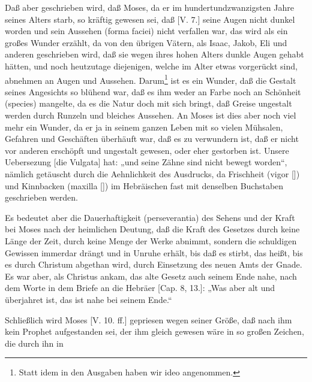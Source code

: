 Daß aber geschrieben wird, daß Moses, da er im hundertundzwanzigsten Jahre seines Alters starb, so kräftig gewesen sei, daß [V. 7.] seine Augen nicht dunkel worden und sein Aussehen (forma faciei) nicht verfallen war, das wird als ein großes Wunder erzählt, da von den übrigen Vätern, als Isaac, Jakob, Eli und anderen geschrieben wird, daß sie wegen ihres hohen Alters dunkle Augen gehabt hätten, und noch heutzutage diejenigen, welche im Alter etwas vorgerückt sind, abnehmen an Augen und Aussehen. Darum\footnote{Statt idem in den Ausgaben haben wir ideo angenommen.} ist es ein Wunder, daß die Gestalt seines Angesichts so blühend war, daß es ihm weder an Farbe noch an Schönheit (species) mangelte, da es die Natur doch mit sich bringt, daß Greise ungestalt werden durch Runzeln und bleiches Aussehen. An Moses ist dies aber noch viel mehr ein Wunder, da er ja in seinem ganzen Leben mit so vielen Mühsalen, Gefahren und Geschäften überhäuft war, daß es zu verwundern ist, daß er nicht vor anderen erschöpft und ungestalt gewesen, oder eher gestorben ist. Unsere Uebersezung [die Vulgata] hat: „und seine Zähne sind nicht bewegt worden“, nämlich getäuscht durch die Aehnlichkeit des Ausdrucks, da Frischheit (vigor []) und Kinnbacken (maxilla []) im Hebräischen fast mit denselben Buchstaben geschrieben werden.

Es bedeutet aber die Dauerhaftigkeit (perseverantia) des Sehens und der Kraft bei Moses nach der heimlichen Deutung, daß die Kraft des Gesetzes durch keine Länge der Zeit, durch keine Menge der Werke abnimmt, sondern die schuldigen Gewissen immerdar drängt und in Unruhe erhält, bis daß es stirbt, das heißt, bis es durch Christum abgethan wird, durch Einsetzung des neuen Amts der Gnade. Es war aber, als Christus ankam, das alte Gesetz auch seinem Ende nahe, nach dem Worte in dem Briefe an die Hebräer [Cap. 8, 13.]: „Was aber alt und überjahret ist, das ist nahe bei seinem Ende.“

Schließlich wird Moses [V. 10. ff.] gepriesen wegen seiner Größe, daß nach ihm kein Prophet aufgestanden sei, der ihm gleich gewesen wäre in so großen Zeichen, die durch ihn in

